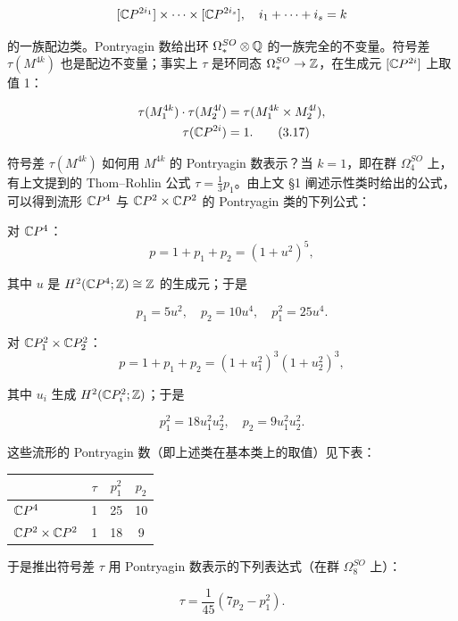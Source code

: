 \[ [\mathbb{C}P^{2i_1}]\times\cdots\times[\mathbb{C}P^{2i_s}],\quad i_1+\cdots+i_s=k \]

的一族配边类。Pontryagin 数给出环 $\Omega_*^{SO}\otimes\mathbb{Q}$ 的一族完全的不变量。符号差 $\tau(M^{4k})$ 也是配边不变量；事实上 $\tau$ 是环同态 $\Omega_*^{SO}\to\mathbb{Z}$，在生成元 $[\mathbb{C}P^{2i}]$ 上取值 1：

\begin{align}
\tau(M_1^{4k})\cdot\tau(M_2^{4l}) &= \tau(M_1^{4k}\times M_2^{4l}), \nonumber\\
\tau(\mathbb{C}P^{2i}) &= 1. \tag{3.17}
\end{align}


符号差 $\tau(M^{4k})$ 如何用 $M^{4k}$ 的 Pontryagin 数表示？当 $k=1$，即在群 $\Omega_4^{SO}$ 上，有上文提到的 Thom--Rohlin 公式 $\tau=\frac{1}{3}p_1$。由上文 §1 阐述示性类时给出的公式，可以得到流形 $\mathbb{C}P^4$ 与 $\mathbb{C}P^2\times\mathbb{C}P^2$ 的 Pontryagin 类的下列公式：

对 $\mathbb{C}P^4$：
\[ p=1+p_1+p_2=(1+u^2)^5, \]

其中 $u$ 是 $H^2(\mathbb{C}P^4;\mathbb{Z})\cong\mathbb{Z}$ 的生成元；于是

\[ p_1=5u^2,\quad p_2=10u^4,\quad p_1^2=25u^4. \]

对 $\mathbb{C}P_1^2\times\mathbb{C}P_2^2$：
\[ p=1+p_1+p_2=(1+u_1^2)^3(1+u_2^2)^3, \]

其中 $u_i$ 生成 $H^2(\mathbb{C}P_i^2;\mathbb{Z})$；于是

\[ p_1^2=18u_1^2u_2^2,\quad p_2=9u_1^2u_2^2. \]

这些流形的 Pontryagin 数（即上述类在基本类上的取值）见下表：

\begin{center}
\begin{tabular}{lccc}
\toprule
 & $\tau$ & $p_1^2$ & $p_2$ \\
\midrule
$\mathbb{C}P^4$ & 1 & 25 & 10 \\
$\mathbb{C}P^2\times\mathbb{C}P^2$ & 1 & 18 & 9 \\
\bottomrule
\end{tabular}
\end{center}

于是推出符号差 $\tau$ 用 Pontryagin 数表示的下列表达式（在群 $\Omega_8^{SO}$ 上）：

\begin{equation}
\tau=\frac{1}{45}(7p_2-p_1^2). \tag{3.18}
\end{equation}

